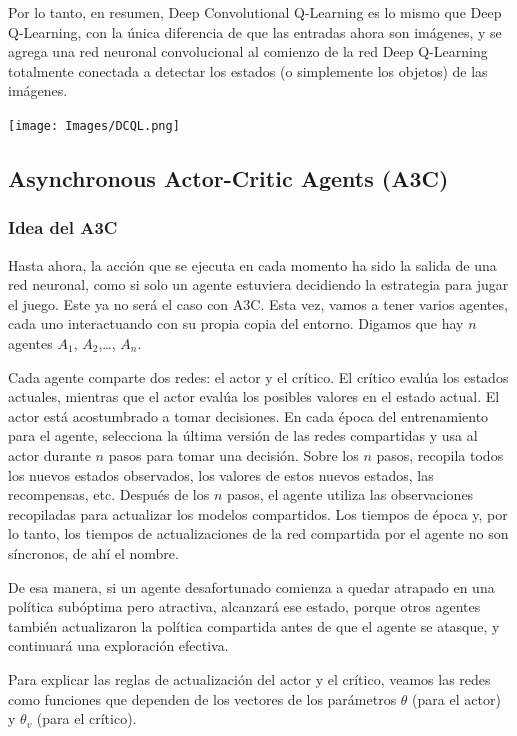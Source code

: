 \documentclass[
]{book}
\begin{document}
Por lo tanto, en resumen, Deep Convolutional Q-Learning es lo mismo que Deep Q-Learning, con la única diferencia de que las entradas ahora son imágenes, y se agrega una red neuronal convolucional al comienzo de la red Deep Q-Learning totalmente conectada a detectar los estados (o simplemente los objetos) de las imágenes.

\texttt{[image: Images/DCQL.png]}

\hypertarget{asynchronous-actor-critic-agents-a3c}{%
\subsection{Asynchronous Actor-Critic Agents (A3C)}\label{asynchronous-actor-critic-agents-a3c}}

\hypertarget{idea-del-a3c}{%
\subsubsection{Idea del A3C}\label{idea-del-a3c}}

Hasta ahora, la acción que se ejecuta en cada momento ha sido la salida de una red neuronal, como si solo un agente estuviera decidiendo la estrategia para jugar el juego. Este ya no será el caso con A3C. Esta vez, vamos a tener varios agentes, cada uno interactuando con su propia copia del entorno. Digamos que hay \(n\) agentes \(A_1\), \(A_2\),\ldots, \(A_n\).

Cada agente comparte dos redes: el actor y el crítico. El crítico evalúa los estados actuales, mientras que el actor evalúa los posibles valores en el estado actual. El actor está acostumbrado a tomar decisiones. En cada época del entrenamiento para el agente, selecciona la última versión de las redes compartidas y usa al actor durante \(n\) pasos para tomar una decisión. Sobre los \(n\) pasos, recopila todos los nuevos estados observados, los valores de estos nuevos estados, las recompensas, etc. Después de los \(n\) pasos, el agente utiliza las observaciones recopiladas para actualizar los modelos compartidos. Los tiempos de época y, por lo tanto, los tiempos de actualizaciones de la red compartida por el agente no son síncronos, de ahí el nombre.

De esa manera, si un agente desafortunado comienza a quedar atrapado en una política subóptima pero atractiva, alcanzará ese estado, porque otros agentes también actualizaron la política compartida antes de que el agente se atasque, y continuará una exploración efectiva.

Para explicar las reglas de actualización del actor y el crítico, veamos las redes como funciones que dependen de los vectores de los parámetros \(\theta\) (para el actor) y \(\theta_v\) (para el crítico).
\end{document}
